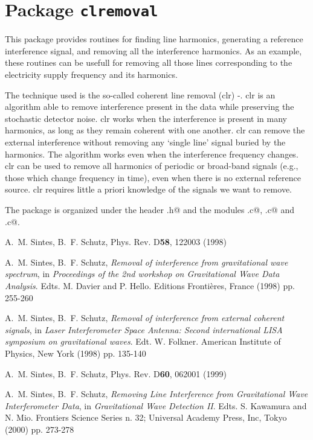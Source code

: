 \chapter{Package \texttt{clremoval}}


This package provides routines for finding line harmonics,
generating a reference interference signal, and removing
all the interference harmonics. As an example, these routines can be usefull
for removing all those lines corresponding to the electricity supply
 frequency and its harmonics.

The technique used  is the so-called coherent line removal
({\sc clr}) \cite{Sintes:1998}-\cite{Sintes:2000}.
 {\sc clr} is an algorithm able to remove interference present in the
 data while preserving the stochastic detector noise.  {\sc clr}
 works when the interference is present in many harmonics, as long as
   they remain coherent with one another.
{\sc clr} can remove the external
 interference without removing any \lq single line' signal buried by the
 harmonics. The algorithm works even when the interference frequency changes.
{\sc clr} can be used to remove all harmonics of periodic or
broad-band signals (e.g., those which change frequency in time), even when
there is no external reference source.  {\sc clr} requires little
 a priori knowledge of the signals we want to remove.

The package  is organized under the header \verb@CLR.h@ and the modules
  \verb@HarmonicFinder.c@,  \verb@RefInterference.c@ and
 \verb@CleanAll.c@.



\newpage


\newpage\begin{thebibliography}{0}

  A.~M. Sintes, B.~F. Schutz, Phys. Rev. D\textbf{58}, 122003 (1998)

  A.~M. Sintes, B.~F. Schutz,
 \textit{Removal of interference from gravitational wave spectrum}, in
 \textit{Proceedings of the 2nd workshop on Gravitational Wave
  Data Analysis}.
  Edts. M. Davier and P. Hello. Editions Fronti\`eres,
  France (1998) pp. 255-260

  A.~M. Sintes, B.~F. Schutz,
  \textit{Removal of interference from external coherent signals}, in
  \textit{Laser Interferometer Space Antenna:
  Second international LISA symposium on gravitational waves}.
  Edt. W. Folkner. American Institute of Physics, New York (1998) pp. 135-140

  A.~M. Sintes, B.~F. Schutz, Phys. Rev. D\textbf{60}, 062001 (1999)

  A.~M. Sintes, B.~F. Schutz,
  \textit{Removing Line Interference from Gravitational Wave
   Interferometer Data}, in
  \textit{Gravitational Wave Detection II}.
  Edts. S. Kawamura and N. Mio. Frontiers Science Series n. 32;
  Universal Academy Press, Inc, Tokyo  (2000) pp. 273-278

\end{thebibliography}

